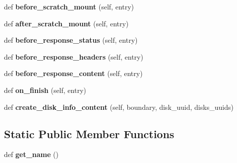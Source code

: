 \begin{DoxyCompactItemize}
def {\bfseries before\+\_\+scratch\+\_\+mount} (self, entry)
\item 
\mbox{\label{class_r_a_i_d5_1_1frontend_1_1services_1_1init__service_1_1_init_service_a96b766af28b7658e58bd475acdf2e2d5}} 
def {\bfseries after\+\_\+scratch\+\_\+mount} (self, entry)
\item 
\mbox{\label{class_r_a_i_d5_1_1frontend_1_1services_1_1init__service_1_1_init_service_a4c0071d394b7d0f510986e3198679807}} 
def {\bfseries before\+\_\+response\+\_\+status} (self, entry)
\item 
\mbox{\label{class_r_a_i_d5_1_1frontend_1_1services_1_1init__service_1_1_init_service_ab5b4ad94cdfd4b56e087f6f969ca9757}} 
def {\bfseries before\+\_\+response\+\_\+headers} (self, entry)
\item 
\mbox{\label{class_r_a_i_d5_1_1frontend_1_1services_1_1init__service_1_1_init_service_a4cfe73d9cd1eed1afdf84adaaf646814}} 
def {\bfseries before\+\_\+response\+\_\+content} (self, entry)
\item 
\mbox{\label{class_r_a_i_d5_1_1frontend_1_1services_1_1init__service_1_1_init_service_ad058cb9a61cc91b0229f9227573e1476}} 
def {\bfseries on\+\_\+finish} (self, entry)
\item 
\mbox{\label{class_r_a_i_d5_1_1frontend_1_1services_1_1init__service_1_1_init_service_a0f3d065d12811e2d6ac2be5f98c912bb}} 
def {\bfseries create\+\_\+disk\+\_\+info\+\_\+content} (self, boundary, disk\+\_\+uuid, disks\+\_\+uuids)
\end{DoxyCompactItemize}
\subsection*{Static Public Member Functions}
\begin{DoxyCompactItemize}
\item 
\mbox{\label{class_r_a_i_d5_1_1frontend_1_1services_1_1init__service_1_1_init_service_a0fb4dbcbec5c90e29da4a88e157e6457}} 
def {\bfseries get\+\_\+name} ()
\end{DoxyCompactItemize}
